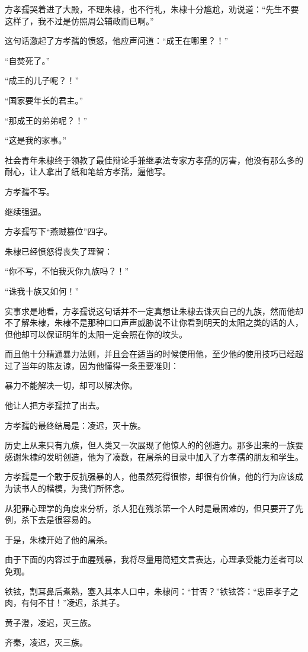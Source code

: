\begin{multicols}{\theparacolNo}
		方孝孺哭着进了大殿，不理朱棣，也不行礼，朱棣十分尴尬，劝说道：“先生不要这样了，我不过是仿照周公辅政而已啊。”

		这句话激起了方孝孺的愤怒，他应声问道：“成王在哪里？！”

		“自焚死了。”

		“成王的儿子呢？！”

		“国家要年长的君主。”

		“那成王的弟弟呢？！”

		“这是我的家事。”

		社会青年朱棣终于领教了最佳辩论手兼继承法专家方孝孺的厉害，他没有那么多的耐心，让人拿出了纸和笔给方孝孺，逼他写。

		方孝孺不写。

		继续强逼。

		方孝孺写下“燕贼篡位”四字。

		朱棣已经愤怒得丧失了理智：

		“你不写，不怕我灭你九族吗？！”

		“诛我十族又如何！”

		实事求是地看，方孝孺说这句话并不一定真想让朱棣去诛灭自己的九族，然而他却不了解朱棣，朱棣不是那种口口声声威胁说不让你看到明天的太阳之类的话的人，但他却可以保证明年的太阳一定会照在你的坟头。

		而且他十分精通暴力法则，并且会在适当的时候使用他，至少他的使用技巧已经超过了当年的陈友谅，因为他懂得一条重要准则：

		暴力不能解决一切，却可以解决你。

		他让人把方孝孺拉了出去。

		方孝孺的最终结局是：凌迟，灭十族。

		历史上从来只有九族，但人类又一次展现了他惊人的的创造力。那多出来的一族要感谢朱棣的发明创造，他为了凑数，在屠杀的目录中加入了方孝孺的朋友和学生。

		方孝孺是一个敢于反抗强暴的人，他虽然死得很惨，却很有价值，他的行为应该成为读书人的楷模，为我们所怀念。

		从犯罪心理学的角度来分析，杀人犯在残杀第一个人时是最困难的，但只要开了先例，杀下去是很容易的。

		于是，朱棣开始了他的屠杀。

		由于下面的内容过于血腥残暴，我将尽量用简短文言表达，心理承受能力差者可以免观。

		铁铉，割耳鼻后煮熟，塞入其本人口中，朱棣问：“甘否？”铁铉答：“忠臣孝子之肉，有何不甘！”凌迟，杀其子。

		黄子澄，凌迟，灭三族。

		齐秦，凌迟，灭三族。


\end{multicols}
